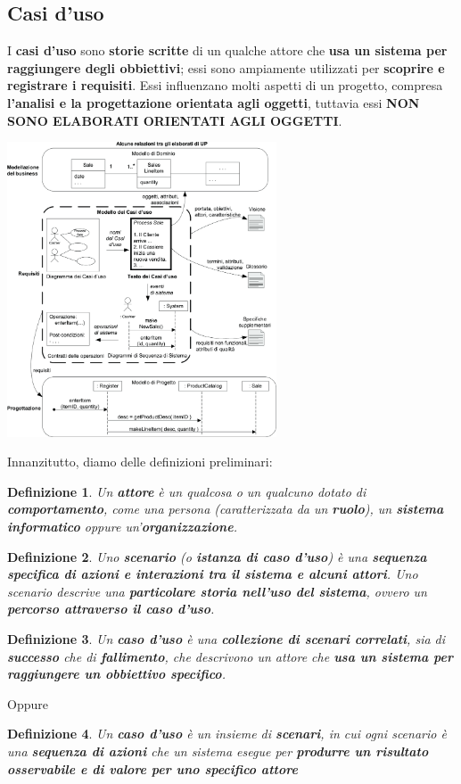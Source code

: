 \documentclass[12pt]{article}
\newtheorem{Definizione}{Definizione}[subsection]
\begin{document}
\subsection{Casi d'uso}
I \textbf{casi d'uso} sono \textbf{storie scritte} di un qualche attore che \textbf{usa un sistema per raggiungere degli obbiettivi}; essi sono ampiamente utilizzati per \textbf{scoprire e registrare i requisiti}.
Essi influenzano molti aspetti di un progetto, compresa \textbf{l'analisi e la progettazione orientata agli oggetti}, tuttavia essi \textbf{NON SONO ELABORATI ORIENTATI AGLI OGGETTI}.
\begin{center}
    \includegraphics[width = 0.60\textwidth]{Images/31.png}
\end{center}
Innanzitutto, diamo delle definizioni preliminari:
\begin{Definizione}
    Un \textbf{attore} è un qualcosa o un qualcuno dotato di \textbf{comportamento}, come una persona (caratterizzata da un \textbf{ruolo}), un \textbf{sistema informatico} oppure un'\textbf{organizzazione}.
\end{Definizione}
\begin{Definizione}
    Uno \textbf{scenario} (o \textbf{istanza di caso d'uso}) è una \textbf{sequenza specifica di azioni e interazioni tra il sistema e alcuni attori}.
    Uno scenario descrive una \textbf{particolare storia nell'uso del sistema}, ovvero un \textbf{percorso attraverso il caso d'uso}.
\end{Definizione}
\begin{Definizione}
    Un \textbf{caso d'uso} è una \textbf{collezione di scenari correlati}, sia di \textbf{successo} che di \textbf{fallimento}, che descrivono un attore che \textbf{usa un sistema per raggiungere un obbiettivo specifico}.
\end{Definizione}
Oppure
\begin{Definizione}
    Un \textbf{caso d'uso} è un insieme di \textbf{scenari}, in cui ogni scenario è una \textbf{sequenza di azioni} che un sistema esegue per \textbf{produrre un risultato osservabile e di valore per uno specifico attore}
\end{Definizione}
\end{document}
